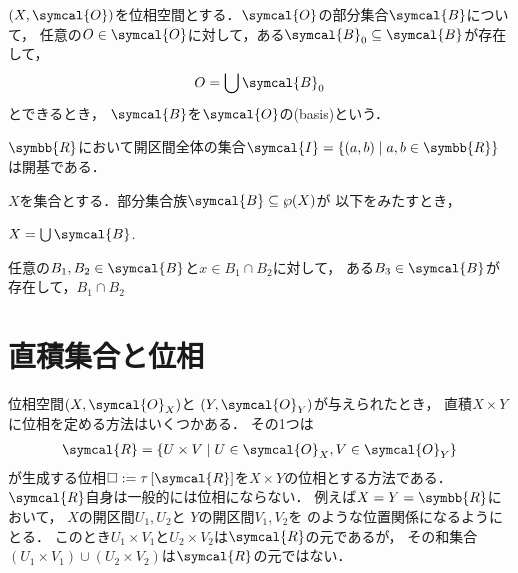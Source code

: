 \documentclass{ltjsbook}
\begin{document}
\begin{thmbox}
\begin{definition}
\((X, \symcal{O})\)を位相空間とする．\(\symcal{O}\)の部分集合\(\symcal{B}\)について，
任意の\(O \in \symcal{O}\)に対して，ある\(\symcal{B}_0 \subseteq \symcal{B}\)が存在して，
\begin{align*}
    O = \bigcup \symcal{B}_0
\end{align*}
とできるとき，
\(\symcal{B}\)を\(\symcal{O}\)の(basis)という．
\end{definition}
\end{thmbox}

\begin{example} \(\symbb{R}\)において開区間全体の集合\(\symcal{I} = \{ (a, b) \mid a,  b \in \symbb{R}\}\)は開基である．
\end{example}

\begin{thmbox}
\begin{theorem}
\(X\)を集合とする．部分集合族\(\symcal{B} \subseteq \wp(X)\)が
以下をみたすとき，
\begin{conditions}
    \item \(X = \bigcup \symcal{B}\).
    \item 任意の\(B_1, B_2 \in \symcal{B}\)と\(x \in B_1 \cap B_2\)に対して，
        ある\(B_3 \in \symcal{B}\)が存在して，\(B_1 \cap B_2\)
\end{conditions}
\end{theorem}
\end{thmbox}

\section{直積集合と位相}
位相空間\(\tuple{X, \symcal{O}_X}\)と \(\tuple{Y, \symcal{O}_Y}\)が与えられたとき，
直積\(X \times Y\)に位相を定める方法はいくつかある．
その1つは
\begin{align*}
    \symcal{R} = \{ U \times V \mid U \in \symcal{O}_X, V \in \symcal{O}_Y\}
\end{align*}
が生成する位相\(\Box := \Generatedtopology{\symcal{R}}\)を\(X \times Y\)の位相とする方法である．
\(\symcal{R}\)自身は一般的には位相にならない．
例えば\(X = Y = \symbb{R}\)において，
\(X\)の開区間\(U_1, U_2\)と
\(Y\)の開区間\(V_1, V_2\)を
のような位置関係になるようにとる．
このとき\(U_1 \times V_1\)と\(U_2 \times V_2\)は\(\symcal{R}\)の元であるが，
その和集合\((U_1 \times V_1) \cup (U_2 \times V_2)\)は\(\symcal{R}\)の元ではない．
\end{document}
